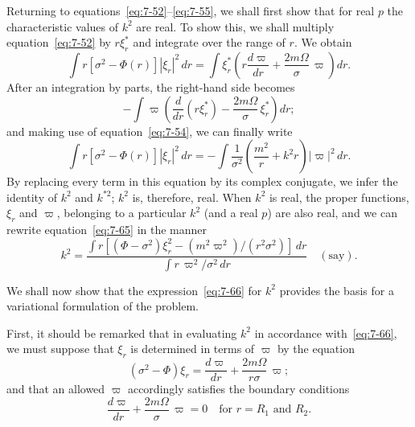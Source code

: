Returning to equations~\eqref{eq:7-52}--\eqref{eq:7-55}, we shall first show that for real $p$
the characteristic values of $k^2$ are real.  To show this, we shall multiply
equation~\eqref{eq:7-52} by $r\xi_r^*$ and integrate over the range of $r$.  We obtain
\begin{equation}
\label{eq:7-63}
\int r[\sigma^2-\Phi(r)]|\xi_r|^2\,dr
= \int \xi_r^*\!\left(r\frac{d\varpi}{dr}+\frac{2m\Omega}{\sigma}\,\varpi\right)dr.
\end{equation}
After an integration by parts, the right-hand side becomes
\begin{equation}
\label{eq:7-64}
-\int \varpi\!\left(\frac{d}{dr}(r\xi_r^*) - \frac{2m\Omega}{\sigma}\,\xi_r^*\right) dr;
\end{equation}
and making use of equation~\eqref{eq:7-54}, we can finally write
\begin{equation}
\label{eq:7-65}
\int r[\sigma^2-\Phi(r)]|\xi_r|^2\,dr
= -\int \frac{1}{\sigma^2}
\!\left(\frac{m^2}{r}+k^2 r\right)|\varpi|^2\,dr.
\end{equation}
By replacing every term in this equation by its complex conjugate, we
infer the identity of $k^2$ and $k^{*2}$; $k^2$ is, therefore, real.  When $k^2$ is real, the
proper functions, $\xi_r$ and $\varpi$, belonging to a particular $k^2$ (and a real $p$)
are also real, and we can rewrite equation~\eqref{eq:7-65} in the manner
\begin{equation}
\label{eq:7-66}
k^2 = \frac{\displaystyle\int
r[(\Phi-\sigma^2)\xi_r^2 - (m^2\varpi^2)/(r^2\sigma^2)]\,dr}
{\displaystyle\int r\,\varpi^2/\sigma^2\,dr}
\quad (\text{say}).
\end{equation}

We shall now show that the expression~\eqref{eq:7-66} for $k^2$ provides the basis
for a variational formulation of the problem.

First, it should be remarked that in evaluating $k^2$ in accordance with~\eqref{eq:7-66}, we must suppose that $\xi_r$ is determined in terms of $\varpi$ by the equation
\begin{equation}
\label{eq:7-67}
(\sigma^2-\Phi)\xi_r = \frac{d\varpi}{dr}+\frac{2m\Omega}{r\sigma}\,\varpi;
\end{equation}
and that an allowed $\varpi$ accordingly satisfies the boundary conditions
\begin{equation}
\label{eq:7-68}
\frac{d\varpi}{dr}+\frac{2m\Omega}{\sigma}\,\varpi = 0
\quad \text{for } r = R_1 \text{ and } R_2.
\end{equation}

